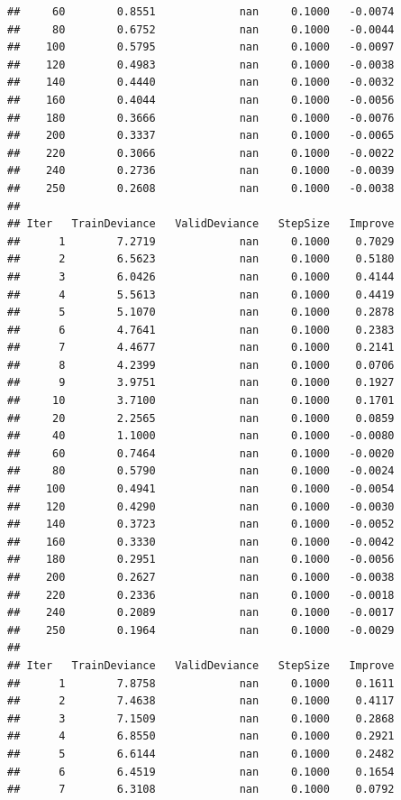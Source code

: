\documentclass[]{book}
\begin{document}
\begin{verbatim}
##     60        0.8551             nan     0.1000   -0.0074
##     80        0.6752             nan     0.1000   -0.0044
##    100        0.5795             nan     0.1000   -0.0097
##    120        0.4983             nan     0.1000   -0.0038
##    140        0.4440             nan     0.1000   -0.0032
##    160        0.4044             nan     0.1000   -0.0056
##    180        0.3666             nan     0.1000   -0.0076
##    200        0.3337             nan     0.1000   -0.0065
##    220        0.3066             nan     0.1000   -0.0022
##    240        0.2736             nan     0.1000   -0.0039
##    250        0.2608             nan     0.1000   -0.0038
## 
## Iter   TrainDeviance   ValidDeviance   StepSize   Improve
##      1        7.2719             nan     0.1000    0.7029
##      2        6.5623             nan     0.1000    0.5180
##      3        6.0426             nan     0.1000    0.4144
##      4        5.5613             nan     0.1000    0.4419
##      5        5.1070             nan     0.1000    0.2878
##      6        4.7641             nan     0.1000    0.2383
##      7        4.4677             nan     0.1000    0.2141
##      8        4.2399             nan     0.1000    0.0706
##      9        3.9751             nan     0.1000    0.1927
##     10        3.7100             nan     0.1000    0.1701
##     20        2.2565             nan     0.1000    0.0859
##     40        1.1000             nan     0.1000   -0.0080
##     60        0.7464             nan     0.1000   -0.0020
##     80        0.5790             nan     0.1000   -0.0024
##    100        0.4941             nan     0.1000   -0.0054
##    120        0.4290             nan     0.1000   -0.0030
##    140        0.3723             nan     0.1000   -0.0052
##    160        0.3330             nan     0.1000   -0.0042
##    180        0.2951             nan     0.1000   -0.0056
##    200        0.2627             nan     0.1000   -0.0038
##    220        0.2336             nan     0.1000   -0.0018
##    240        0.2089             nan     0.1000   -0.0017
##    250        0.1964             nan     0.1000   -0.0029
## 
## Iter   TrainDeviance   ValidDeviance   StepSize   Improve
##      1        7.8758             nan     0.1000    0.1611
##      2        7.4638             nan     0.1000    0.4117
##      3        7.1509             nan     0.1000    0.2868
##      4        6.8550             nan     0.1000    0.2921
##      5        6.6144             nan     0.1000    0.2482
##      6        6.4519             nan     0.1000    0.1654
##      7        6.3108             nan     0.1000    0.0792

\end{verbatim}
\end{document}
